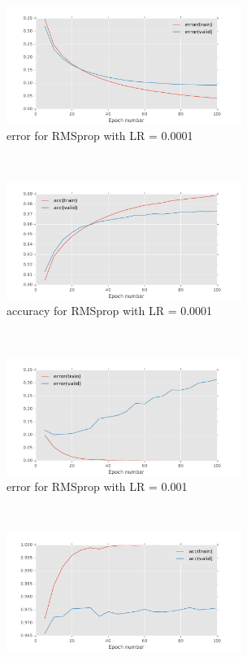 \documentclass[11pt]{article}
\begin{document}
\begin{figure}[t!]
    \centering
    \begin{subfigure}[t]{0.45\textwidth}
        \centering
        \includegraphics[height=1.5in]{error_with_RMSprop_0_0001.pdf}
        \caption{error for RMSprop with LR = 0.0001}
    \end{subfigure}   
    ~
    \begin{subfigure}[t]{0.45\textwidth}
        \centering
        \includegraphics[height=1.5in]{acc_with_RMSprop_0_0001.pdf}
        \caption{accuracy for RMSprop with LR = 0.0001}
    \end{subfigure}    
	~
    \begin{subfigure}[t]{0.45\textwidth}
        \centering
        \includegraphics[height=1.5in]{error_with_RMSprop_0_001.pdf}
        \caption{error for RMSprop with LR = 0.001}
    \end{subfigure}   
    ~
    \begin{subfigure}[t]{0.45\textwidth}
        \centering
        \includegraphics[height=1.5in]{acc_with_RMSprop_0_001.pdf}

\end{subfigure}
\end{figure}
\end{document}
